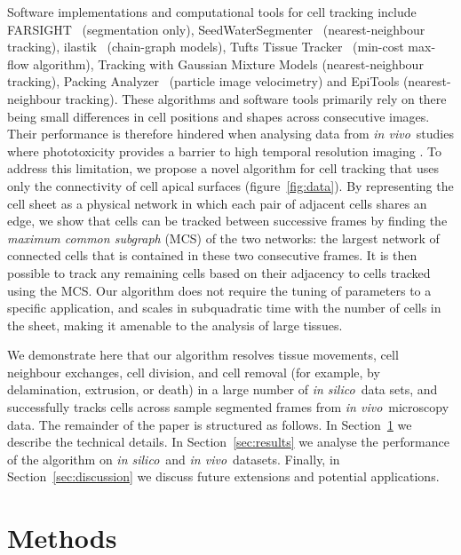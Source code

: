 \documentclass[a4paper,11pt]{article}
\newcommand{\insilico}{\textit{in silico}~}
\newcommand{\invivo}{\textit{in vivo}~}
\begin{document}
Software implementations and computational tools for cell tracking include FARSIGHT~\cite{Kofahi2010} (segmentation only), SeedWaterSegmenter~\cite{Mashburn2012} (nearest-neighbour tracking), ilastik~\cite{Sommer2011} (chain-graph models), Tufts Tissue Tracker~\cite{Cilla2015} (min-cost max-flow algorithm), Tracking with Gaussian Mixture Models \cite{Amat2014} (nearest-neighbour tracking), Packing Analyzer~\cite{Aigouy2010} (particle image velocimetry) and EpiTools \cite{Heller2016} (nearest-neighbour tracking).  
These algorithms and software tools primarily rely on there being small differences in cell positions and shapes across consecutive images. 
Their performance is therefore hindered when analysing data from \invivo studies where phototoxicity provides a barrier to high temporal resolution imaging \cite{Hoebe2007,Wood2005,Mavrakis2008}. 
To address this limitation, we propose a novel algorithm for cell tracking that uses only the connectivity of cell apical surfaces (figure~\ref{fig:data}). 
By representing the cell sheet as a physical network in which each pair of adjacent cells shares an edge, we show that cells can be tracked between successive frames by finding the \textit{maximum common subgraph} (MCS) of the two networks: the largest network of connected cells that is contained in these two consecutive frames. 
It is then possible to track any remaining cells based on their adjacency to cells tracked using the MCS.
Our algorithm does not require the tuning of parameters to a specific application, and scales in subquadratic time with the number of cells in the sheet, making it amenable to the analysis of large tissues. 

We demonstrate here that our algorithm resolves tissue movements, cell neighbour exchanges, cell division, and cell removal (for example, by delamination, extrusion, or death) in a large number of \insilico data sets, and successfully tracks cells across sample segmented frames from \invivo microscopy data. The remainder of the paper is structured as follows. 
In Section~\ref{sec:methods} we describe the technical details. 
In Section~\ref{sec:results} we analyse the performance of the algorithm on \insilico and \invivo datasets. 
Finally, in Section~\ref{sec:discussion} we discuss future extensions and potential applications.


\section{Methods}
\label{sec:methods}
\end{document}
